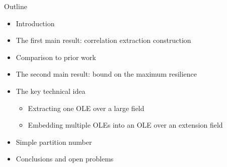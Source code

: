 \begin{frame}{Outline}
	\begin{itemize}
		\item Introduction
		\item The first main result: correlation extraction construction 
		\item Comparison to prior work
		\item The second main result: bound on the maximum resilience
		\item The key technical idea
		\begin{itemize}
			\item Extracting one OLE over a large field
			\item Embedding multiple OLEs into an OLE over an extension field
		\end{itemize}
		\item Simple partition number
		\item Conclusions and open problems
	\end{itemize}
\end{frame}